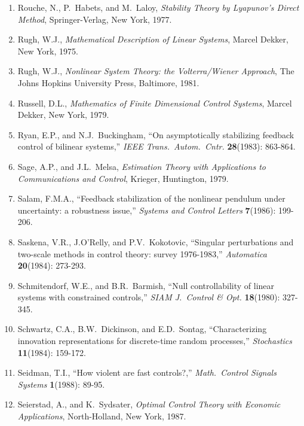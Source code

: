 \begin{enumerate}
\item
Rouche, N., P.\ Habets, and M.\ Laloy, {\it Stability Theory by Lyapunov's
Direct Method}, Springer-Verlag, New York, 1977.

\item
Rugh, W.J., {\it Mathematical Description of Linear Systems}, Marcel Dekker,
New York, 1975.

\item
Rugh, W.J., {\it Nonlinear System Theory: the Volterra/Wiener Approach}, The
Johns Hopkins University Press, Baltimore, 1981.

\item
Russell, D.L., {\it Mathematics of Finite Dimensional Control Systems}, Marcel
Dekker, New York, 1979.

\item
Ryan, E.P., and N.J.\ Buckingham, ``On asymptotically stabilizing feedback
control of bilinear systems,'' {\it IEEE Trans.\ Autom.\ Cntr.} {\bf
28}(1983): 863-864.

\item
Sage, A.P., and J.L.\ Melsa, {\it Estimation Theory with Applications to
Communications and Control}, Krieger, Huntington, 1979.

\item
Salam, F.M.A., ``Feedback stabilization of the nonlinear pendulum under
uncertainty: a robustness issue,'' {\it Systems and Control Letters} {\bf
7}(1986): 199-206.

\item
Saskena, V.R., J.O'Relly, and P.V.\ Kokotovic, ``Singular perturbations and
two-scale methods in control theory: survey 1976-1983,'' {\it Automatica} {\bf
20}(1984): 273-293.

\item
Schmitendorf, W.E., and B.R.\ Barmish, ``Null controllability of linear
systems with constrained controls,'' {\it SIAM J.\ Control \& Opt.} {\bf
18}(1980): 327-345.

\item
Schwartz, C.A., B.W.\ Dickinson, and E.D.\ Sontag, ``Characterizing innovation
representations for discrete-time random processes,'' {\it Stochastics} {\bf
11}(1984): 159-172.

\item
Seidman, T.I., ``How violent are fast controls?,'' {\it Math.\ Control Signals
Systems} {\bf 1}(1988): 89-95.

\item
Seierstad, A., and K.\ Sydsater, {\it Optimal Control Theory with Economic
Applications}, North-Holland, New York, 1987.


\end{enumerate}
